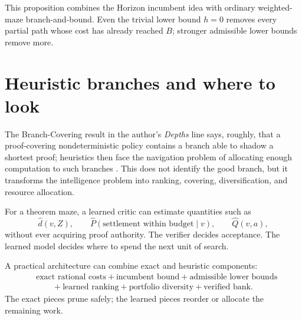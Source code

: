 This proposition combines the Horizon incumbent idea with ordinary weighted-maze branch-and-bound. Even the trivial lower bound $h=0$ removes every partial path whose cost has already reached $B$; stronger admissible lower bounds remove more.

\section{Heuristic branches and where to look}
The Branch-Covering result in the author's \emph{Depths} line says, roughly, that a proof-covering nondeterministic policy contains a branch able to shadow a shortest proof; heuristics then face the navigation problem of allocating enough computation to such branches \cite{depths}. This does not identify the good branch, but it transforms the intelligence problem into ranking, covering, diversification, and resource allocation.

For a theorem maze, a learned critic can estimate quantities such as
\[
\widehat d(v,Z),\qquad
\widehat P(\text{settlement within budget}\mid v),\qquad
\widehat Q(v,a),
\]
without ever acquiring proof authority. The verifier decides acceptance. The learned model decides where to spend the next unit of search.

A practical architecture can combine exact and heuristic components:
\[
\begin{aligned}
&\text{exact rational costs}+\text{incumbent bound}+\text{admissible lower bounds}\\
&\qquad +\text{learned ranking}+\text{portfolio diversity}+\text{verified bank}.
\end{aligned}
\]
The exact pieces prune safely; the learned pieces reorder or allocate the remaining work.
